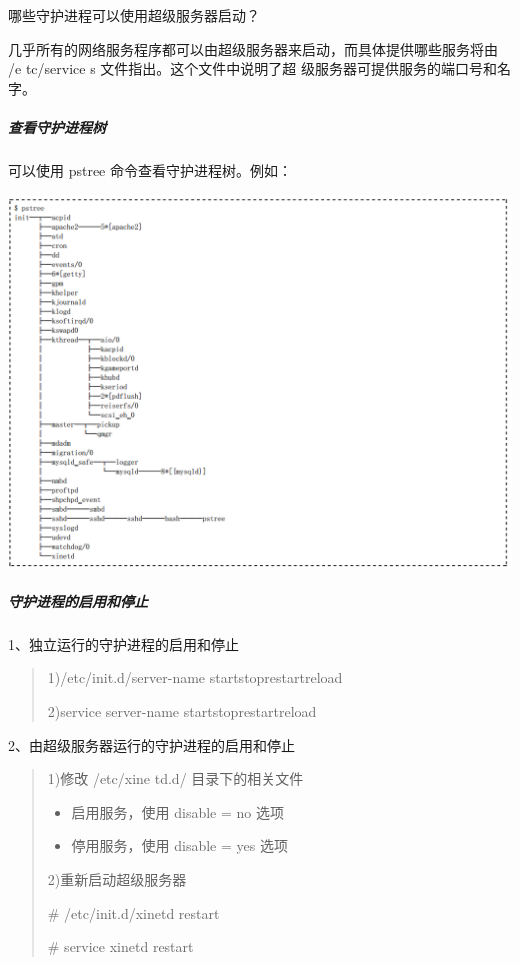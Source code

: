 \documentclass[letterpaper,10pt]{sphinxmanual}
\begin{document}
哪些守护进程可以使用超级服务器启动？

几乎所有的网络服务程序都可以由超级服务器来启动，而具体提供哪些服务将由 /e tc/service s 文件指出。这个文件中说明了超
级服务器可提供服务的端口号和名字。


\subparagraph{查看守护进程树}
\label{Linux_pro_mana/process:id14}
可以使用 pstree 命令查看守护进程树。例如：

\includegraphics{pstree.png}


\subparagraph{守护进程的启用和停止}
\label{Linux_pro_mana/process:id15}
1、独立运行的守护进程的启用和停止
\begin{quote}

1)/etc/init.d/server-name start\textbar{}stop\textbar{}restart\textbar{}reload

2)service server-name start\textbar{}stop\textbar{}restart\textbar{}reload
\end{quote}

2、由超级服务器运行的守护进程的启用和停止
\begin{quote}

1)修改 /etc/xine td.d/ 目录下的相关文件
\begin{itemize}
\item {} 
启用服务，使用 disable = no 选项

\item {} 
停用服务，使用 disable = yes 选项

\end{itemize}

2)重新启动超级服务器

\# /etc/init.d/xinetd restart

\# service xinetd restart
\end{quote}
\end{document}
